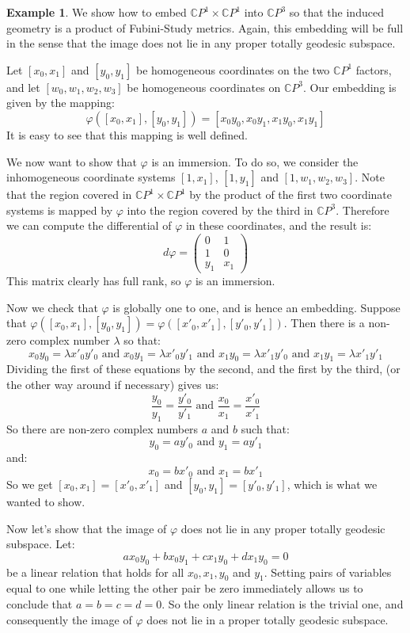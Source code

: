 \documentclass[11pt]{amsart}
\theoremstyle{definition}
\newtheorem{example}[subsection]{Example}
\def \CP{ \mathbb{C}P }
\begin{document}
\begin{example} We show how to embed $\CP^1 \times \CP^1$ into $\CP^3$ so that the induced geometry is a product of Fubini-Study metrics.  Again, this embedding will be full in the sense that the image does not lie in any proper totally geodesic subspace. 

Let $[x_0,x_1]$ and $[y_0, y_1]$ be homogeneous coordinates on the two $\CP^1$ factors, and let $[w_0, w_1, w_2, w_3]$ be homogeneous coordinates on $\CP^3$.  Our embedding is given by the mapping:
%
$$\varphi( [x_0, x_1], [y_0, y_1] ) = [ x_0 y_0, x_0 y_1, x_1 y_0, x_1 y_1 ]$$
%
It is easy to see that this mapping is well defined.

We now want to show that $\varphi$ is an immersion.  To do so, we consider the inhomogeneous coordinate systems $[1,x_1]$, $[1,y_1]$ and $[1,w_1,w_2,w_3]$.  Note that the region covered in $\CP^1 \times \CP^1$ by the product of the first two coordinate systems is mapped by $\varphi$ into the region covered by the third in $\CP^3$.  Therefore we can compute the differential of $\varphi$ in these coordinates, and the result is:
%
$$ d \varphi = \left( \begin{array}{cc} 0 & 1 \\ 1 & 0 \\ y_1 & x_1 \end{array} \right) $$
%
This matrix clearly has full rank, so $\varphi$ is an immersion.

Now we check that $\varphi$ is globally one to one, and is hence an embedding.  Suppose that $\varphi( [x_0, x_1], [y_0, y_1 ] ) = \varphi( [x'_0, x'_1], [y'_0, y'_1 ] )$.  Then there is a non-zero complex number $\lambda$ so that:
%
$$ x_0 y_0 = \lambda x'_0 y'_0 \text{ and } x_0 y_1 = \lambda x'_0 y'_1 \text{ and } x_1 y_0 = \lambda x'_1 y'_0 \text{ and } x_1 y_1 = \lambda x'_1 y'_1 $$
%
Dividing the first of these equations by the second, and the first by the third, (or the other way around if necessary) gives us:
%
$$ \frac{y_0}{y_1} = \frac{y'_0}{y'_1} \text{ and } \frac{x_0}{x_1} = \frac{x'_0}{x'_1} $$
%
So there are non-zero complex numbers $a$ and $b$ such that:
%
$$ y_0 = a y'_0 \text{ and } y_1 = a y'_1 $$
%
and:
%
$$ x_0 = b x'_0 \text{ and } x_1 = b x'_1 $$
%
So we get $[x_0, x_1] = [x'_0, x'_1]$ and $[y_0, y_1] = [y'_0, y'_1]$, which is what we wanted to show.

Now let's show that the image of $\varphi$ does not lie in any proper totally geodesic subspace.  Let:
%
$$ a x_0 y_0 + b x_0 y_1 + c x_1 y_0 + d x_1 y_0 = 0 $$
%
be a linear relation that holds for all $x_0, x_1, y_0$ and $y_1$.  Setting pairs of variables equal to one while letting the other pair be zero immediately allows us to conclude that $a=b=c=d=0$.  So the only linear relation is the trivial one, and consequently the image of $\varphi$ does not lie in a proper totally geodesic subspace.


\end{example}
\end{document}

